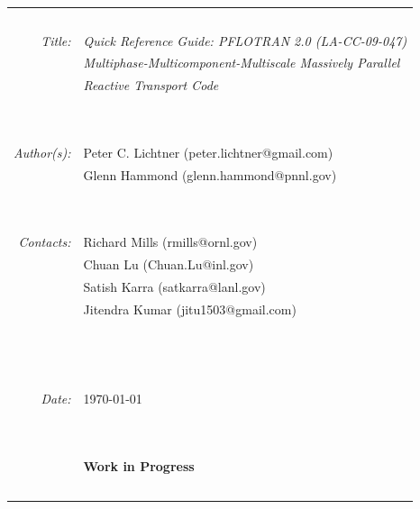 \documentclass[12pt]{article}
\newcommand{\bc}{\begin{center}}
\newcommand{\ec}{\end{center}}
\begin{document}

\normalsize

\bc
\begin{tabular}{r|l}
~ & ~\\
{\em Title:} & {\sl Quick Reference Guide: PFLOTRAN 2.0 (LA-CC-09-047)}\\
~ & {\sl Multiphase-Multicomponent-Multiscale Massively Parallel} \\
~ & {\sl Reactive Transport Code}\\
~ & ~\\
~ & ~\\
{\em Author(s):} & Peter C. Lichtner (peter.lichtner@gmail.com)\\
~  & Glenn Hammond (glenn.hammond@pnnl.gov)\\
~ & ~\\
~ & ~\\
{\em Contacts:}  & Richard Mills (rmills@ornl.gov)\\
~ & Chuan Lu (Chuan.Lu@inl.gov)\\
~ & Satish Karra (satkarra@lanl.gov)\\
~ & Jitendra Kumar (jitu1503@gmail.com)\\
~ & \\%
~ & ~\\
~ & ~\\
{\em Date:} & \today \\
~ & ~\\
~ & ~\\
~ & {\bf \large Work in Progress}\\
~ & ~\\
\end{tabular}
\ec
\end{document}
